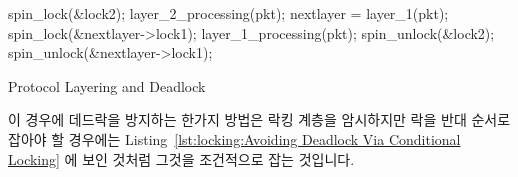 \fi

\begin{listing}[tbp]
\begin{fcvlabel}
\begin{VerbatimL}[commandchars=\\\{\}]
spin_lock(&lock2);
layer_2_processing(pkt);
nextlayer = layer_1(pkt);
spin_lock(&nextlayer->lock1);	
layer_1_processing(pkt);
spin_unlock(&lock2);
spin_unlock(&nextlayer->lock1);
\end{VerbatimL}
\end{fcvlabel}
\caption{Protocol Layering and Deadlock}
\label{lst:locking:Protocol Layering and Deadlock}
\end{listing}

이 경우에 데드락을 방지하는 한가지 방법은 락킹 계층을 암시하지만 락을 반대
순서로 잡아야 할 경우에는
Listing~\ref{lst:locking:Avoiding Deadlock Via Conditional Locking}
에 보인 것처럼 그것을 조건적으로 잡는 것입니다.
